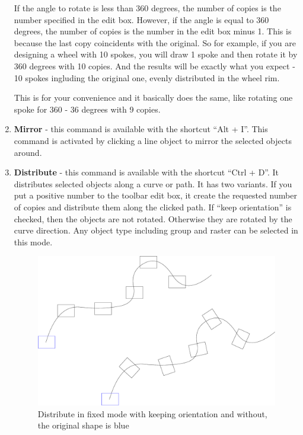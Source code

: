 \begin{enumerate}
If the angle to rotate is less than 360 degrees, the number of copies is the number
specified in the edit box. However, if the angle is equal to 360 degrees, the number
of copies is the number in the edit box minus 1. This is because the last copy
coincidents with the original. So for example, if you are designing a wheel with
10 spokes, you will draw 1 spoke and then rotate it by 360 degrees with 10 copies.
And the results will be exactly what you expect - 10 spokes ingluding the original one,
evenly distributed in the wheel rim.

This is for your convenience and it basically does the same, like rotating one spoke
for 360 - 36 degrees with 9 copies.
\item \textbf{Mirror} - this command is available with the shortcut ``Alt + I''.
This command is activated by clicking a line object to mirror the selected objects
around.
\item \textbf{Distribute} - this command is available with the shortcut ``Ctrl + D''.
It distributes selected objects along a curve or path. It has two variants.
If you put a positive number to the toolbar edit box, it create the requested number
of copies and distribute them along the clicked path. If ``keep orientation'' is
checked, then the objects are not rotated. Otherwise they are rotated by the curve
direction. Any object type including group and raster can be selected in this mode.

\begin{figure}[h]
\begin{center}
\includegraphics[scale=0.2]{Images/distr_fixed.eps}
\caption{Distribute in fixed mode with keeping orientation and without, the
original shape is blue}
\end{center}
\end{figure}


\end{enumerate}
